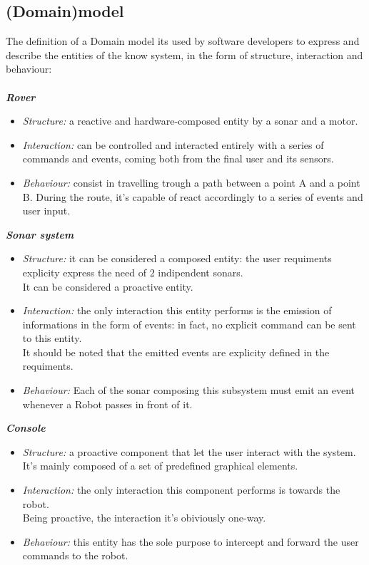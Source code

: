 \documentclass{llncs}
\begin{document}
\subsection{(Domain)model}
The definition of a Domain model its used by software developers to express and describe the entities of the know system, in the form of structure, interaction and behaviour:\\\\
\textit{\textbf{Rover}}
\begin{itemize}
\item \textit{Structure:} a reactive and hardware-composed entity by a sonar and a motor.
\item \textit{Interaction:} can be controlled and interacted entirely with a series of commands and events, coming both from the final user and 										its sensors.
\item \textit{Behaviour:} consist in travelling trough a path between a point A and a point B.
During the route, it's capable of react accordingly to a series of events and user input.
\end{itemize}
\textit{\textbf{Sonar system}}
\begin{itemize}
\item \textit{Structure:} it can be considered a composed entity: the user requiments explicity express the need of 2 indipendent sonars.\\It can be considered a proactive entity.
\item \textit{Interaction:} the only interaction this entity performs is the emission of informations in the form of events: in fact, no explicit command can be sent to this entity.\\
It should be noted that the emitted events are explicity defined in the requiments.
\item \textit{Behaviour:} Each of the sonar composing this subsystem must emit an event whenever a Robot passes in front of it. 
\end{itemize}
\textit{\textbf{Console}}
\begin{itemize}
\item \textit{Structure:} a proactive component that let the user interact with the system.\\ It's mainly composed of a set of predefined graphical elements.
\item \textit{Interaction:} the only interaction this component performs is towards the robot.\\Being proactive, the interaction it's obiviously one-way.
\item \textit{Behaviour:} this entity has the sole purpose to intercept and forward the user commands to the robot.
\end{itemize}
\newpage
\end{document}
